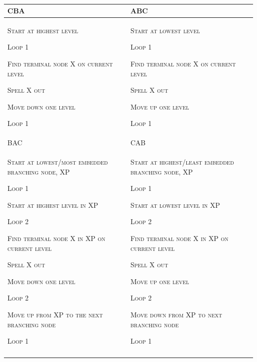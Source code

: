   \begin{table}
\begin{tabularx}{\textwidth}{XX}
\lsptoprule
CBA & ABC\\
\midrule 
\textsc{Start at highest level}

\textsc{Loop 1}

     \textsc{Find terminal node X on current level}

     \textsc{Spell X out}

     \textsc{Move down one level}

\textsc{Loop 1} & \textsc{Start at lowest level}

\textsc{Loop 1}

     \textsc{Find terminal node X on current level}

     \textsc{Spell X out}

     \textsc{Move up one level}

\textsc{Loop 1}\\
BAC & CAB\\
\textsc{Start at lowest}\textsc{/}\textsc{most embedded branching node, XP}

\textsc{Loop 1}

      \textsc{Start at highest level in XP}

      \textsc{Loop 2}

         \textsc{Find terminal node X in XP on current level}

         \textsc{Spell X out}

         \textsc{Move down one level}

      \textsc{Loop 2}

      \textsc{Move up from XP to the next branching node}

\textsc{Loop 1} & \textsc{Start at highest}\textsc{/}\textsc{least embedded branching node, XP}

\textsc{Loop 1}

      \textsc{Start at lowest level in XP}

      \textsc{Loop 2}

         \textsc{Find terminal node X in XP on current level}

         \textsc{Spell X out}

         \textsc{Move up one level}

      \textsc{Loop 2}

      \textsc{Move down from XP to next branching node}

\textsc{Loop 1}\\
\lspbottomrule
\end{tabularx}
\caption{\missingcaption}\label{tab:key:}
\end{table}


